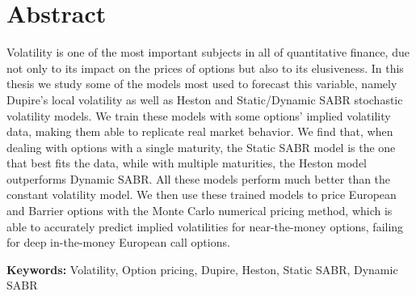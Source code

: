
\section*{Abstract}

Volatility is one of the most important subjects in all of quantitative finance, due not only to its impact on the prices of options but also to its elusiveness. In this thesis we study some of the models most used to forecast this variable, namely Dupire's local volatility as well as Heston and Static/Dynamic SABR stochastic volatility models.
We train these models with some options' implied volatility data, making them able to replicate real market behavior. We find that, when dealing with options with a single maturity, the Static SABR model is the one that best fits the data, while with multiple maturities, the Heston model outperforms Dynamic SABR. All these models perform much better than the constant volatility model.
We then use these trained models to price European and Barrier options with the Monte Carlo numerical pricing method, which is able to accurately predict implied volatilities for near-the-money options, failing for deep in-the-money European call options.

\vfill

\textbf{\Large Keywords:} Volatility, Option pricing, Dupire, Heston, Static SABR, Dynamic SABR


